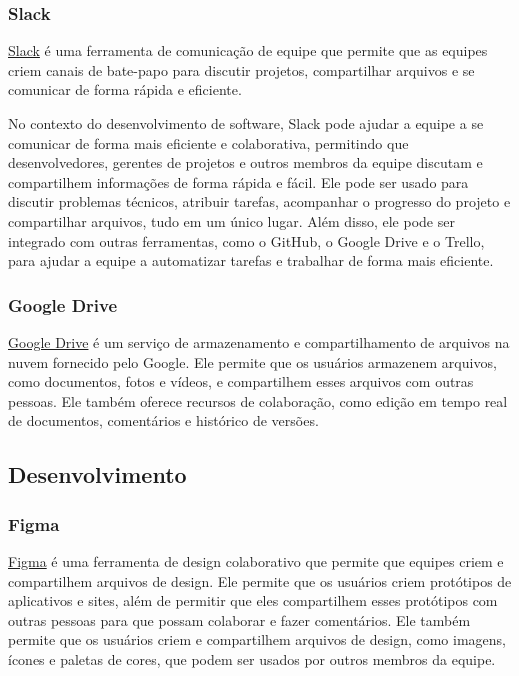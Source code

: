 \subsubsection{Slack}

\href{https://slack.com/}{Slack} é uma ferramenta de comunicação de equipe que permite que as equipes criem canais de bate-papo para discutir projetos, compartilhar arquivos e se comunicar de forma rápida e eficiente.

No contexto do desenvolvimento de software, Slack pode ajudar a equipe a se comunicar de forma mais eficiente e colaborativa, permitindo que desenvolvedores, gerentes de projetos e outros membros da equipe discutam e compartilhem informações de forma rápida e fácil. Ele pode ser usado para discutir problemas técnicos, atribuir tarefas, acompanhar o progresso do projeto e compartilhar arquivos, tudo em um único lugar. Além disso, ele pode ser integrado com outras ferramentas, como o GitHub, o Google Drive e o Trello, para ajudar a equipe a automatizar tarefas e trabalhar de forma mais eficiente.

\subsubsection{Google Drive}

\href{https://www.google.com/intl/pt-br/drive/about.html}{Google Drive} é um serviço de armazenamento e compartilhamento de arquivos na nuvem fornecido pelo Google. Ele permite que os usuários armazenem arquivos, como documentos, fotos e vídeos, e compartilhem esses arquivos com outras pessoas. Ele também oferece recursos de colaboração, como edição em tempo real de documentos, comentários e histórico de versões.

\subsection{Desenvolvimento}

\subsubsection{Figma}

\href{https://www.figma.com/}{Figma} é uma ferramenta de design colaborativo que permite que equipes criem e compartilhem arquivos de design. Ele permite que os usuários criem protótipos de aplicativos e sites, além de permitir que eles compartilhem esses protótipos com outras pessoas para que possam colaborar e fazer comentários. Ele também permite que os usuários criem e compartilhem arquivos de design, como imagens, ícones e paletas de cores, que podem ser usados por outros membros da equipe.

